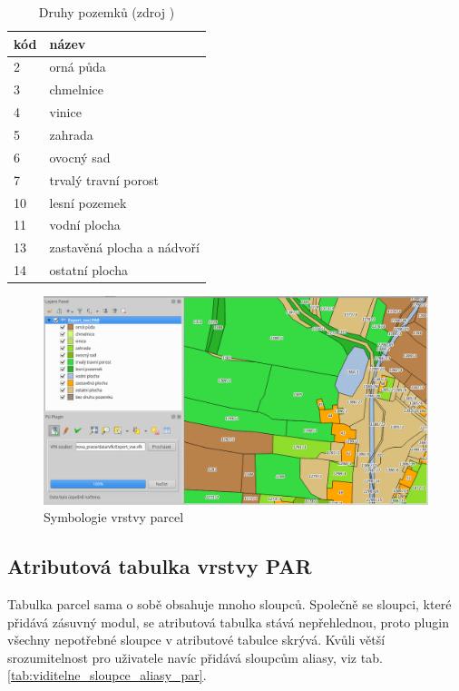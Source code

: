 \begin{table}[H]
    \begin{tabular}{|l|l|}
        \hline
         kód & název \\
        \hline
        \hline
          2 & orná půda \\ \hline
          3 & chmelnice \\ \hline          
          4 & vinice \\ \hline
          5 & zahrada \\ \hline
          6 & ovocný sad \\ \hline
          7 & trvalý travní porost \\ \hline
          10 & lesní pozemek \\ \hline
          11 & vodní plocha \\ \hline
          13 & zastavěná plocha a nádvoří \\ \hline
          14 & ostatní plocha \\
         \hline
    \end{tabular}
    \centering
    \caption[Druhy pozemků]{Druhy pozemků (zdroj \citep{vyhlaska_357})}
    \label{tab:druhy_pozemku}
\end{table}

	\begin{figure}[H]
		\centering
		\includegraphics[width=.9\textwidth]{./pictures/symbologie_par.png}
		\caption[Symbologie vrstvy parcel]{Symbologie vrstvy parcel}
		\label{fig:symbologie_par}
 	\end{figure}

\subsection{Atributová tabulka vrstvy PAR}
\label{tabulka_par}

Tabulka parcel sama o sobě obsahuje mnoho sloupců. Společně se sloupci, které přidává zásuvný modul, se atributová tabulka stává nepřehlednou, proto plugin všechny nepotřebné sloupce v atributové tabulce skrývá. Kvůli větší srozumitelnost pro uživatele navíc přidává sloupcům aliasy, viz tab. \ref{tab:viditelne_sloupce_aliasy_par}.


